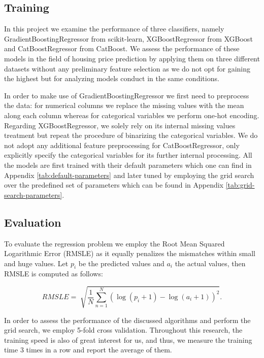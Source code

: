 \subsection{Training}

In this project we examine the performance of three classifiers, namely GradientBoostingRegressor from scikit-learn, XGBoostRegressor from XGBoost and CatBoostRegressor from CatBoost. We assess the performance of these models in the field of housing price prediction by applying them on three different datasets without any preliminary feature selection as we do not opt for gaining the highest but for analyzing models conduct in the same conditions.

In order to make use of GradientBoostingRegressor we first need to preprocess the data: for numerical columns we replace the missing values with the mean along each column whereas for categorical variables we perform one-hot encoding. Regarding XGBoostRegressor, we solely rely on its internal missing values treatment but repeat the procedure of binarizing the categorical variables. We do not adopt any additional feature preprocessing for CatBoostRegressor, only explicitly specify the categorical variables for its further internal processing. All the models are first trained with their default parameters which one can find in Appendix \cref{tab:default-parameters} and later tuned by employing the grid search over the predefined set of parameters which can be found in Appendix \cref{tab:grid-search-parameters}.

\subsection{Evaluation}

To evaluate the regression problem we employ the Root Mean Squared Logarithmic Error (RMSLE) as it equally penalizes the mismatches within small and huge values. Let $p_i$ be the predicted values and $a_i$ the actual values, then RMSLE is computed as follows:

$$ RMSLE = \sqrt[]{\frac{1}{N}\sum_{n = 1}^N (\log(p_i + 1) - \log(a_i + 1))^2}. $$

In order to assess the performance of the discussed algorithms and perform the grid search, we employ 5-fold cross validation. Throughout this research, the training speed is also of great interest for us, and thus, we measure the training time 3 times in a row and report the average of them.



